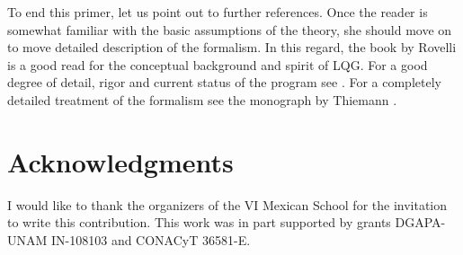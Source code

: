 \documentclass[aps,prd,tightenlines,showpacs,nofootinbib,preprint]{revtex4}
\begin{document}
To end this primer, let us point out to further references. Once
the reader is somewhat familiar with the basic assumptions of the
theory, she should move on to move detailed description of the
formalism. In this regard, the book by Rovelli
\cite{Rovelli:2004tv} is a good read for the conceptual background
and spirit of LQG. For a good degree of detail, rigor and current
status of the program see \cite{AL:review}. For a completely
detailed treatment of the formalism see the monograph by Thiemann
\cite{Thiemann:2001yy}.




\clearpage
\section*{Acknowledgments}

\noindent I would like to thank the organizers of the VI Mexican
School for the invitation  to write this contribution. This work
was in part supported by grants DGAPA-UNAM IN-108103 and CONACyT
36581-E.
\end{document}
